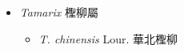 
  \begin{itemize}
 \item[] \textit{Tamarix} 檉柳屬
                                
  \begin{itemize}
        \item[] \textit{T. chinensis} Lour.  華北檉柳   
  \end{itemize}
  \end{itemize}
